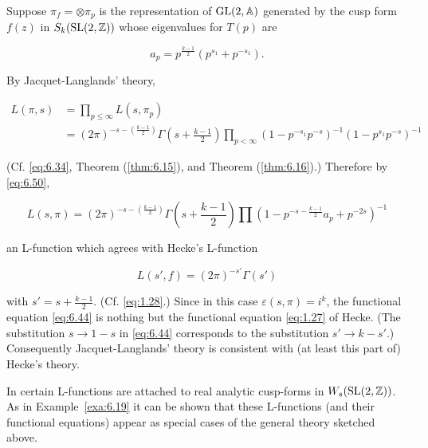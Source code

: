 \begin{example}\label{exa:6.19}

Suppose $\pi_f = \otimes \pi_p$ is the representation of $\operatorname{GL}(2,\mathbb{A})$ generated by the cusp form $f(z)$ in $S_k(\operatorname{SL}(2,\mathbb{Z}))$ whose eigenvalues for $T(p)$ are

\begin{equation}\label{eq:6.50}
a_p = p^{\frac{k-1}{2}}\left(p^{s_1} + p^{-s_1}\right).\tag{6.50}
\end{equation}

By Jacquet-Langlands' theory,

\[
\begin{aligned}
L(\pi, s) &= \prod_{p \leq \infty} L(s, \pi_p)\\
&= (2\pi)^{-s - \left(\frac{k-1}{2}\right)} \Gamma\!\left(s + \frac{k-1}{2}\right) \prod_{p < \infty} \left(1 - p^{-s_1}p^{-s}\right)^{-1}\left(1 - p^{s_1}p^{-s}\right)^{-1}
\end{aligned}
\]

(Cf. \eqref{eq:6.34}, Theorem  (\ref{thm:6.15}), and Theorem  (\ref{thm:6.16}).) Therefore by \eqref{eq:6.50},

\[
L(s, \pi) = (2\pi)^{-s - \left(\frac{k-1}{2}\right)} \Gamma\!\left(s + \frac{k-1}{2}\right) \prod \left(1 - p^{-s - \frac{k-1}{2}}a_p + p^{-2s}\right)^{-1}
\]

an L-function which agrees with Hecke's L-function

\[
L(s', f) = (2\pi)^{-s'}\Gamma(s')
\]

with $s' = s + \frac{k-1}{2}$. (Cf. \eqref{eq:1.28}.) Since in this case $\varepsilon(s, \pi) = i^k$, the functional equation \eqref{eq:6.44} is nothing but the functional equation \eqref{eq:1.27} of Hecke. (The substitution $s \to 1-s$ in \eqref{eq:6.44} corresponds to the substitution $s' \to k-s'$.) Consequently Jacquet-Langlands' theory is consistent with (at least this part of) Hecke's theory.

\end{example}

\begin{example}\label{exa:6.20}

In \cite{Maass} certain L-functions are attached to real analytic cusp-forms in $W_s(\operatorname{SL}(2,\mathbb{Z}))$. As in Example~\ref{exa:6.19} it can be shown that these L-functions (and their functional equations) appear as special cases of the general theory sketched above.

\end{example}

